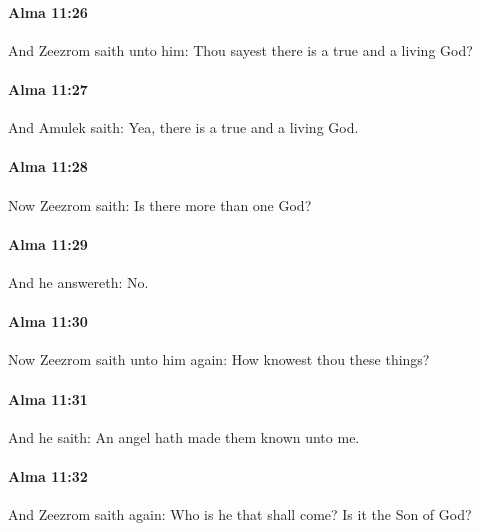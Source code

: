 		\paragraph{Alma 11:26} %
			\label{ALMA-11-26}

			And Zeezrom saith unto him:
			Thou sayest there is a true and a living God?

		\paragraph{Alma 11:27} %
			\label{ALMA-11-27}

			And Amulek saith:
			Yea, there is a true and a living God.

		\paragraph{Alma 11:28} %
			\label{ALMA-11-28}

			Now Zeezrom saith:
			Is there more than one God?

		\paragraph{Alma 11:29} %
			\label{ALMA-11-29}

			And he answereth: No.

		\paragraph{Alma 11:30} %
			\label{ALMA-11-30}

			Now Zeezrom saith unto him again:
			How knowest thou these things?

		\paragraph{Alma 11:31} %
			\label{ALMA-11-31}

			And he saith:
			An angel hath made them known unto me.

		\paragraph{Alma 11:32} %
			\label{ALMA-11-32}

			And Zeezrom saith again:
			Who is he that shall come?
			Is it the Son of God?

